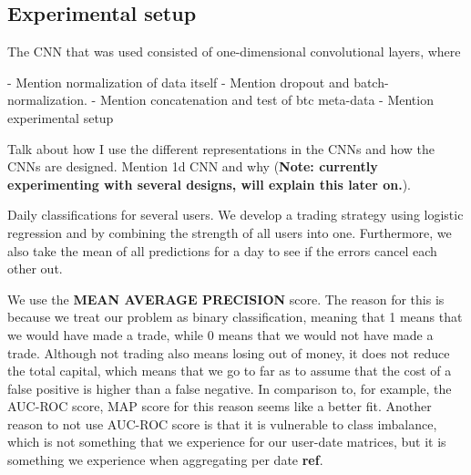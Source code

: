 \documentclass{article}
\begin{document}


\subsection{Experimental setup}
The CNN that was used consisted of one-dimensional convolutional layers, where 

- Mention normalization of data itself
- Mention dropout and batch-normalization.
- Mention concatenation and test of btc meta-data
- Mention experimental setup


Talk about how I use the different representations in the CNNs and how the CNNs are designed. Mention 1d CNN and why (\textbf{Note: currently experimenting with several designs, will explain this later on.}).

Daily classifications for several users. We develop a trading strategy using logistic regression and by combining the strength of all users into one. Furthermore, we also take the mean of all predictions for a day to see if the errors cancel each other out.


We use the \textbf{MEAN AVERAGE PRECISION} score. The reason for this is because we treat our problem as binary classification, meaning that 1 means that we would have made a trade, while 0 means that we would not have made a trade. Although not trading also means losing out of money, it does not reduce the total capital, which means that we go to far as to assume that the cost of a false positive is higher than a false negative. In comparison to, for example, the AUC-ROC score, MAP score for this reason seems like a better fit. Another reason to not use AUC-ROC score is that it is vulnerable to class imbalance, which is not something that we experience for our user-date matrices, but it is something we experience when aggregating per date \textbf{ref}.
\end{document}
